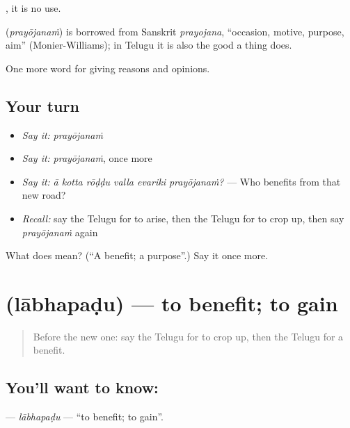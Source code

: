  , it is no use.

\begin{cousinweb}
\textbf{} (\emph{prayōjanaṁ}) is borrowed from Sanskrit \emph{prayojana}, \textquotedblleft{}occasion, motive, purpose, aim\textquotedblright{} (Monier-Williams); in Telugu it is also the good a thing does.
\end{cousinweb}

\begin{grammarlens}[title={What you've built}]
One more word for giving reasons and opinions.
\end{grammarlens}

\subsection*{Your turn}
\begin{itemize}
\raggedright
  \item \emph{Say it:} \emph{prayōjanaṁ}
  \item \emph{Say it:} \emph{prayōjanaṁ}, once more
  \item \emph{Say it:} \emph{ā kotta rōḍḍu valla evariki prayōjanaṁ?} — Who benefits from that new road?
  \item \emph{Recall:} say the Telugu for to arise, then the Telugu for to crop up, then say \emph{prayōjanaṁ} again
\end{itemize}

\begin{tcolorbox}[breakable,colback=teal!4,colframe=teal!35!black,title={Before you move on}]
What does  mean? (\textquotedblleft{}A benefit; a purpose\textquotedblright{}.) Say it once more.
\end{tcolorbox}
\section[\texorpdfstring{\te{లాభపడు} (lābhapaḍu)}{లాభపడు (lābhapaḍu)}]{ (lābhapaḍu) — to benefit; to gain}

\label{lesson:TE-C393-labhapadu}



\begin{quote}
Before the new one: say the Telugu for to crop up, then the Telugu for a benefit.
\end{quote}

\subsection*{You'll want to know: }
\textbf{} — \emph{lābhapaḍu} — \textquotedblleft{}to benefit; to gain\textquotedblright{}.

